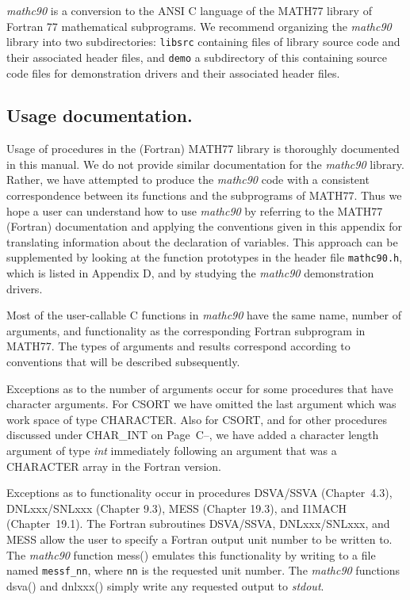 \documentclass[twoside]{MATH77}
\begin{document}
{\em mathc90} is a conversion to the ANSI C language of the MATH77 library of
Fortran 77 mathematical subprograms.  We recommend organizing the {\em
  mathc90} library into two subdirectories: {\tt libsrc} containing files of
library source code and their associated header files, and {\tt demo} a
subdirectory of this containing source code files for demonstration drivers
and their associated header files.

\subsection{Usage documentation.\label{Usage}}

Usage of procedures in the (Fortran) MATH77 library is thoroughly
documented in this manual.  We do not provide similar documentation for the
{\em mathc90} library.  Rather, we have attempted to produce the {\em
mathc90} code with a consistent correspondence between its functions and
the subprograms of MATH77.  Thus we hope a user can understand how to use
{\em mathc90} by referring to the MATH77 (Fortran) documentation and applying
the conventions given in this appendix for translating information about
the declaration of variables.  This approach can be supplemented by
looking at the function prototypes in the header file {\tt mathc90.h},
which is listed in Appendix D, and by studying the {\em mathc90}
demonstration drivers.

Most of the user-callable C functions in {\em mathc90} have the same name,
number of arguments, and functionality as the corresponding Fortran
subprogram in MATH77. The types of arguments and results correspond
according to conventions that will be described subsequently.

Exceptions as to the number of arguments occur for some procedures
that have character arguments. For CSORT we have omitted the last
argument which was work space of type CHARACTER. Also for CSORT, and
for other procedures discussed under CHAR\_INT on
Page~C--\pageref{char}, we have added a character length argument of
type {\em int} immediately following an argument that was a CHARACTER
array in the Fortran version.

Exceptions as to functionality occur in procedures DSVA/SSVA
(Chapter~4.3), DNLxxx/SNLxxx (Chapter 9.3), MESS (Chapter 19.3), and I1MACH
(Chapter~19.1).  The Fortran subroutines DSVA/SSVA, DNLxxx/SNLxxx, and MESS
allow the user to specify a Fortran output unit number to be written to. The
{\em mathc90} function mess() emulates this functionality by writing to a
file named {\tt messf\_nn}, where {\tt nn} is the requested unit number. The {\em
mathc90} functions dsva() and dnlxxx() simply write any requested
output to {\em stdout}.
\end{document}
